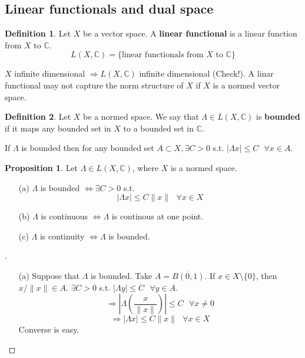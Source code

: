 \documentclass{article}
\newcommand{\sfa}{\text{  } \forall}
\theoremstyle{definition}
\newtheorem{dfn}{Definition}
\newtheorem{prop}{Proposition}
\newenvironment{proofs}[1][\proofname]{%
  \begin{proof}[#1]$ $\par\nobreak\ignorespaces
}{%
  \end{proof}
}
\begin{document}
\subsection{Linear functionals and dual space}

\begin{dfn}
	Let $X$ be a vector space. A \textbf{linear functional} is a linear function from $X$ to $\mathbb{C}$. 
  \[
    L(X, \mathbb{C}) = \{\text{linear functionals from }X \text{ to } \mathbb{C}\}
  \]
\end{dfn}

$X$ infinite dimensional $\Rightarrow L(X, \mathbb{C})$ infinite dimensional (Check!). A linar functional may not capture the norm structure of $X$ if $X$ is a normed vector space. 

\begin{dfn}
	Let $X$ be a normed space. We say that $\Lambda \in L(X, \mathbb{C})$ is \textbf{bounded} if it maps any bounded set in $X$ to a bounded set in $\mathbb{C}$. 
\end{dfn}

If $\Lambda$ is bounded then for any bounded set $A \subset X, \exists C > 0$ s.t. $|\Lambda x| \leq C \sfa x \in A$.

\begin{prop}
  Let $\Lambda \in L(X, \mathbb{C})$, where $X$ is a normed space. 
  \begin{enumerate}
    \item[(a)] $\Lambda$ is bounded $\iff \exists C > 0$ s.t.
      \[
        |\Lambda x| \leq C \| x \| \sfa x \in X
      \]
    \item[(b)] $\Lambda$ is continuous $\iff \Lambda$ is continous at one point. 
    \item[(c)] $\Lambda$ is continuity $\iff \Lambda$ is bounded. 
  \end{enumerate}
\end{prop}

\begin{proofs}
  \begin{enumerate}
    \item[(a)] Suppose that $\Lambda$ is bounded. Take $A = \overline{B(0, 1)}$. If $x \in X\setminus \{0\}$, then $x/\|x\| \in A$. $\exists C > 0$ s.t. $|\Lambda y| \leq C \sfa y \in A$. 
      \[
        \Rightarrow \left|\Lambda \left(\frac{x}{\|x\|} \right)\right| \leq C \sfa x \neq 0
      \]
      \[
        \Rightarrow |\Lambda x| \leq C \|x\| \sfa x \in X
      \]
      Converse is easy. 
  \end{enumerate}
\end{proofs}
\end{document}
